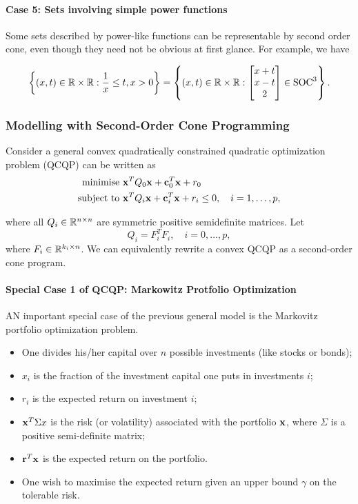 \paragraph{Case 5: Sets involving simple power functions}

Some sets described by power-like functions can be representable by second order cone, even though they need not be obvious at first glance. For example, we have

\[\left\{(x, t) \in \mathbb{R} \times \mathbb{R} : \frac{1}{x} \leq t, x > 0\right\} = \left\{(x, t) \in \mathbb{R} \times \mathbb{R} : \begin{bmatrix}
        x + t \\ x - t \\ 2
    \end{bmatrix} \in \operatorname{SOC}^3\right\}.\]

\subsubsection{Modelling with Second-Order Cone Programming}

Consider a general convex quadratically constrained quadratic optimization problem (QCQP) can be written as
\begin{align*}
    \text{minimise }   & \mathbf{x}^TQ_0\mathbf{x} + \mathbf{c}_0^T\mathbf{x} + r_0                                \\
    \text{subject to } & \mathbf{x}^TQ_i\mathbf{x} + \mathbf{c}_i^T\mathbf{x} + r_i \leq 0, \quad i = 1, \dots, p,
\end{align*}

where all \(Q_i \in \mathbb{R}^{n \times n}\) are symmetric positive semidefinite matrices. Let
\[Q_i = F_i^T F_i, \quad i = 0,\dots, p,\]
where \(F_i \in \mathbb{R}^{k_i \times n}\). We can equivalently rewrite a convex QCQP as a second-order cone program. \\

\paragraph{Special Case 1 of QCQP: Markowitz Protfolio Optimization}
AN important special case of the previous general model is the Markovitz portfolio optimization problem.
\begin{itemize}
    \item One divides his/her capital over \(n\) possible investments (like stocks or bonds);
    \item \(x_i\) is the fraction of the investment capital one puts in investments \(i\);
    \item \(r_i\) is the expected return on investment \(i\);
    \item \(\mathbf{x}^T\Sigma x\) is the risk (or volatility) associated with the portfolio \(\mathbf{x}\), where \(\Sigma\) is a positive semi-definite matrix;
    \item \(\mathbf{r}^T\mathbf{x}\) is the expected return on the portfolio.
    \item One wish to maximise the expected return given an upper bound \(\gamma\) on the tolerable risk.
\end{itemize}

